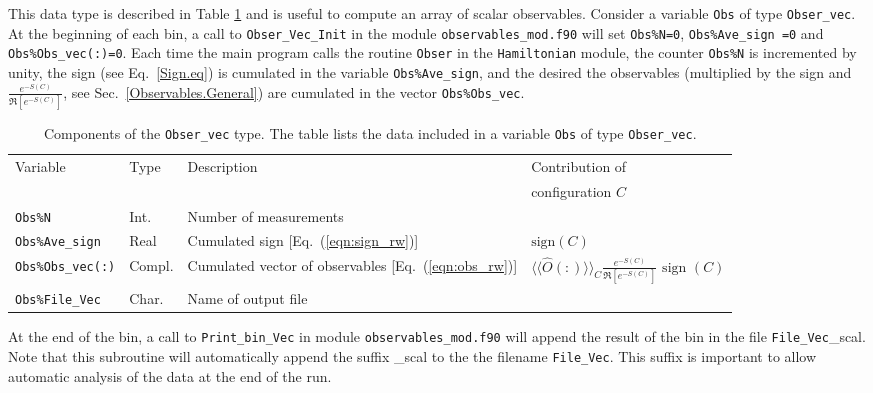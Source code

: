 This data type  is described in Table  \ref{table:Obser_vec} and  is useful to compute an array of  scalar observables.   Consider  a variable \texttt{Obs} of type  \texttt{Obser\_vec}.  At the beginning of each bin,  a call to  \texttt{Obser\_Vec\_Init} in the module \texttt{observables\_mod.f90}  will  set   \texttt{Obs\%N=0},   \texttt{Obs\%Ave\_sign =0}  and  \texttt{Obs\%Obs\_vec(:)=0}.  Each time the main  program calls the routine \texttt{Obser}  in the  \texttt{Hamiltonian} module,  the counter \texttt{Obs\%N}   is incremented by unity,   the sign  (see Eq.~\ref{Sign.eq}) is cumulated in the  variable \texttt{Obs\%Ave\_sign},  and the desired  the observables (multiplied by the sign and   $\frac{e^{-S(C)}} {\Re \left[e^{-S(C)} \right]}$, see Sec.~\ref{Observables.General})  are cumulated in the vector \texttt{Obs\%Obs\_vec}.  
%
\begin{table}[h]
   \begin{tabular}{@{} l l l l @{}}\toprule
    Variable  &  Type      &  Description &  Contribution of  \\
        &  & & configuration $C$ \\\midrule
    \texttt{Obs\%N}                       &  Int.        &   Number of measurements &\\
    \texttt{Obs\%Ave\_sign}               &  Real     &    Cumulated sign [Eq.~(\ref{eqn:sign_rw})] & $\text{sign}(C)$  \\
    \texttt{Obs\%Obs\_vec(:)}        & Compl.      &    Cumulated vector of observables [Eq.~(\ref{eqn:obs_rw})] &
           $ \langle \langle \hat{O}(:) \rangle \rangle_{C}\frac{e^{-S(C)}} {\Re \left[e^{-S(C)} \right]} \text{ sign }(C) $ \\
     \texttt{Obs\%File\_Vec}           &  Char.    &    Name of output file  &\\\bottomrule
   \end{tabular}
   \caption{Components of the \texttt{Obser\_vec}  type.  The table lists the data included in a variable  \texttt{Obs}  of type \texttt{Obser\_vec}.  
         \label{table:Obser_vec}}
\end{table}
%
At the end of the bin, a call to  \texttt{Print\_bin\_Vec}   in  module \texttt{observables\_mod.f90}  will  append the result of the bin in the file  \texttt{File\_Vec}\_scal.  Note that this subroutine will automatically append the suffix  \_scal 
to the the filename \texttt{File\_Vec}.    This suffix  is important to allow automatic analysis of the data at the end of the run. 

